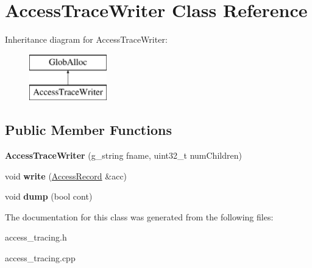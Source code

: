 \hypertarget{classAccessTraceWriter}{\section{Access\-Trace\-Writer Class Reference}
\label{classAccessTraceWriter}
}
Inheritance diagram for Access\-Trace\-Writer\-:\begin{figure}[H]
\begin{center}
\leavevmode
\includegraphics[height=2.000000cm]{classAccessTraceWriter}
\end{center}
\end{figure}
\subsection*{Public Member Functions}
\begin{DoxyCompactItemize}
\item 
\hypertarget{classAccessTraceWriter_a3568333a53ecf4ec44662e0672f8be82}{{\bfseries Access\-Trace\-Writer} (g\-\_\-string fname, uint32\-\_\-t num\-Children)}\label{classAccessTraceWriter_a3568333a53ecf4ec44662e0672f8be82}

\item 
\hypertarget{classAccessTraceWriter_a969899467ba61480b908533ca4c5b8e9}{void {\bfseries write} (\hyperlink{structAccessRecord}{Access\-Record} \&acc)}\label{classAccessTraceWriter_a969899467ba61480b908533ca4c5b8e9}

\item 
\hypertarget{classAccessTraceWriter_a8cfa74417b866f32240f174df5ce6805}{void {\bfseries dump} (bool cont)}\label{classAccessTraceWriter_a8cfa74417b866f32240f174df5ce6805}

\end{DoxyCompactItemize}


The documentation for this class was generated from the following files\-:\begin{DoxyCompactItemize}
\item 
access\-\_\-tracing.\-h\item 
access\-\_\-tracing.\-cpp\end{DoxyCompactItemize}
